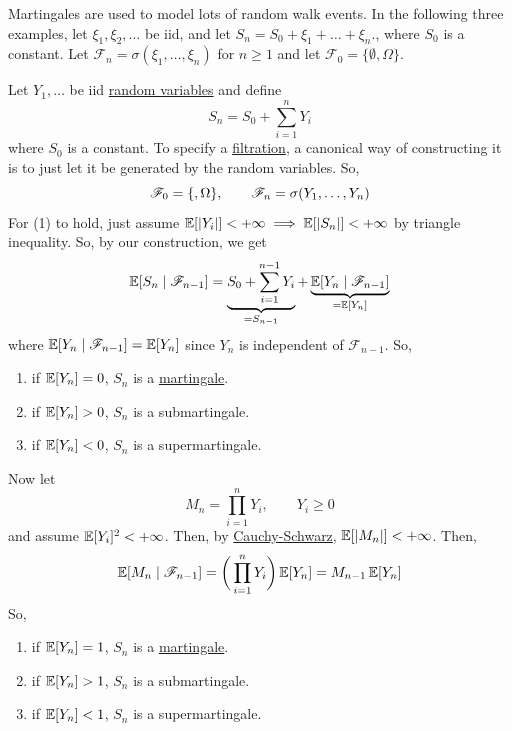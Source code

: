   Martingales are used to model lots of random walk events. In the following three examples, let $\xi_1, \xi_2, \ldots$ be iid, and let $S_n = S_0 + \xi_1 + \ldots + \xi_n$., where $S_0$ is a constant. Let $\mathcal{F}_n = \sigma(\xi_1, \ldots, \xi_n)$ for $n \geq 1$ and let $\mathcal{F}_0 = \{\emptyset, \Omega\}$. 

	\begin{example}
	  \label{ex:random-walk}
	  Let $Y_1, \ldots$ be iid \hyperref[prob-def:random-variable]{random variables} and define 
		\begin{equation}
			S_n = S_0 + \sum_{i=1}^n Y_i
		\end{equation}
		where $S_0$ is a constant. To specify a \hyperref[def:filtration]{filtration}, a canonical way of constructing it is to just let it be generated by the random variables. So, 
		\begin{equation}
			\mathscr{F}_0 = \{\empty,  \Omega\}, \qquad \mathscr{F}_n = \sigma(Y_1, \ldots, Y_n)
		\end{equation}
		For (1) to hold, just assume $\operatorname{\mathbb{E}}[|Y_i|] < +\infty \implies \operatorname{\mathbb{E}}[|S_n|] < +\infty$ by triangle inequality. So, by our construction, we get 
		\begin{equation}
			\operatorname{\mathbb{E}}[S_n \mid \mathscr{F}_{n-1}] = \underbrace{S_0 + \sum_{i=1}^{n-1} Y_i}_{= S_{n-1}} + \underbrace{\operatorname{\mathbb{E}}[Y_n \mid \mathscr{F}_{n-1}]}_{= \operatorname{\mathbb{E}}[Y_n]} 
		\end{equation}
		where $\operatorname{\mathbb{E}}[Y_n \mid \mathscr{F}_{n-1}] = \operatorname{\mathbb{E}}[Y_n]$ since $Y_n$ is independent of $\mathscr{F}_{n-1}$. So, 
		\begin{enumerate}
			\item if $\operatorname{\mathbb{E}}[Y_n] = 0$, $S_n$ is a \hyperref[def:martingale]{martingale}. 
			\item if $\operatorname{\mathbb{E}}[Y_n] > 0$, $S_n$ is a submartingale. 
			\item if $\operatorname{\mathbb{E}}[Y_n] < 0$, $S_n$ is a supermartingale. 
		\end{enumerate}
	\end{example}

	\begin{example}
	  \label{ex:products-of-nonnegative-random-variables}
	  Now let 
		\begin{equation}
			M_n = \prod_{i=1}^n Y_i, \qquad Y_i \geq 0
		\end{equation}
		and assume $\operatorname{\mathbb{E}}[Y_i]^2 < +\infty$. Then, by \hyperref[prob-thm:cauchy-schwarz]{Cauchy-Schwarz}, $\operatorname{\mathbb{E}}[|M_n|] < +\infty$. Then, 
		\begin{equation}
			\operatorname{\mathbb{E}}[M_n \mid \mathscr{F}_{n-1}] = \bigg( \prod_{i=1}^n Y_i \bigg) \operatorname{\mathbb{E}}[Y_n] = M_{n-1} \operatorname{\mathbb{E}}[Y_n]
		\end{equation}
		So, 
		\begin{enumerate}
			\item if $\operatorname{\mathbb{E}}[Y_n] = 1$, $S_n$ is a \hyperref[def:martingale]{martingale}. 
			\item if $\operatorname{\mathbb{E}}[Y_n] > 1$, $S_n$ is a submartingale. 
			\item if $\operatorname{\mathbb{E}}[Y_n] < 1$, $S_n$ is a supermartingale. 
		\end{enumerate}
	\end{example}

